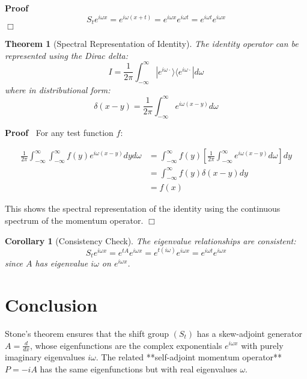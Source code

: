 \documentclass{article}
\newenvironment{proof}{\noindent\textbf{Proof\ }}{\hspace*{\fill}$\Box$\medskip}
\newtheorem{corollary}{Corollary}
\newtheorem{theorem}{Theorem}
\begin{document}
\begin{proof}
  \[ S_t e^{i \omega x} = e^{i \omega (x + t)} = e^{i \omega x} e^{i \omega t}
     = e^{i \omega t} e^{i \omega x} \]
\end{proof}

\begin{theorem}
  [Spectral Representation of Identity] The identity operator can be
  represented using the Dirac delta:
  \[ I = \frac{1}{2 \pi}  \int_{- \infty}^{\infty} |e^{i \omega \cdot} \rangle
     \langle e^{i \omega \cdot} |d \omega \]
  where in distributional form:
  \[ \delta (x - y) = \frac{1}{2 \pi}  \int_{- \infty}^{\infty} e^{i \omega (x
     - y)} d \omega \]
\end{theorem}

\begin{proof}
  For any test function $f$:
  
  \begin{align}
    \frac{1}{2 \pi}  \int_{- \infty}^{\infty} \int_{- \infty}^{\infty} f (y)
    e^{i \omega (x - y)} dyd \omega & = \int_{- \infty}^{\infty} f (y)  \left[
    \frac{1}{2 \pi}  \int_{- \infty}^{\infty} e^{i \omega (x - y)} d \omega
    \right] dy \\
    & = \int_{- \infty}^{\infty} f (y) \delta (x - y) dy \\
    & = f (x) 
  \end{align}
  
  This shows the spectral representation of the identity using the continuous
  spectrum of the momentum operator.
\end{proof}

\begin{corollary}
  [Consistency Check] The eigenvalue relationships are consistent:
  \[ S_t e^{i \omega x} = e^{tA} e^{i \omega x} = e^{t (i \omega)} e^{i \omega
     x} = e^{i \omega t} e^{i \omega x} \]
  since $A$ has eigenvalue $i \omega$ on $e^{i \omega x}$.
\end{corollary}

\section*{Conclusion}

Stone's theorem ensures that the shift group $(S_t)$ has a skew-adjoint
generator $A = \frac{d}{dx}$, whose eigenfunctions are the complex
exponentials $e^{i \omega x}$ with purely imaginary eigenvalues $i \omega$.
The related **self-adjoint momentum operator** $P = - iA$ has the same
eigenfunctions but with real eigenvalues $\omega$.
\end{document}
